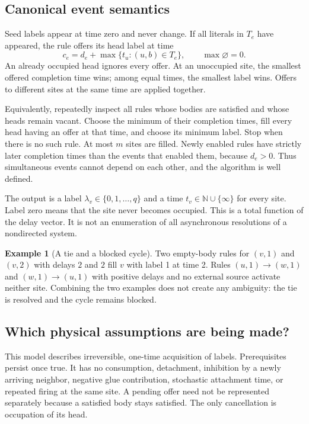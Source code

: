 \documentclass[11pt,letterpaper]{article}
\theoremstyle{definition}
\newtheorem{example}[theorem]{Example}
\theoremstyle{remark}
\newcommand{\N}{\mathbb N}
\begin{document}
\subsection{Canonical event semantics}
Seed labels appear at time zero and never change. If all literals in $T_e$
have appeared, the rule offers its head label at time
\begin{equation}\label{qoc:ts:eq:offer}
 c_e=d_e+\max\{t_u:(u,b)\in T_e\},\qquad \max\varnothing=0.
\end{equation}
An already occupied head ignores every offer. At an unoccupied site, the
smallest offered completion time wins; among equal times, the smallest
label wins. Offers to different sites at the same time are applied together.

Equivalently, repeatedly inspect all rules whose bodies are satisfied and
whose heads remain vacant. Choose the minimum of their completion times,
fill every head having an offer at that time, and choose its minimum label.
Stop when there is no such rule. At most $m$ sites are filled. Newly enabled
rules have strictly later completion times than the events that enabled
them, because $d_e>0$. Thus simultaneous events cannot depend on each other,
and the algorithm is well defined.

The output is a label $\lambda_v\in\{0,1,\ldots,q\}$ and a time
$t_v\in\N\cup\{\infty\}$ for every site. Label zero means that the site
never becomes occupied. This is a total function of the delay vector.
It is not an enumeration of all asynchronous resolutions of a nondirected
system.

\begin{example}[A tie and a blocked cycle]
Two empty-body rules for $(v,1)$ and $(v,2)$ with delays $2$ and $2$ fill
$v$ with label 1 at time 2. Rules $(u,1)\to(w,1)$ and
$(w,1)\to(u,1)$ with positive delays and no external source activate
neither site. Combining the two examples does not create any ambiguity:
the tie is resolved and the cycle remains blocked.
\end{example}

\subsection{Which physical assumptions are being made?}
This model describes irreversible, one-time acquisition of labels.
Prerequisites persist once true. It has no consumption, detachment,
inhibition by a newly arriving neighbor, negative glue contribution,
stochastic attachment time, or repeated firing at the same site. A pending
offer need not be represented separately because a satisfied body stays
satisfied. The only cancellation is occupation of its head.
\end{document}
